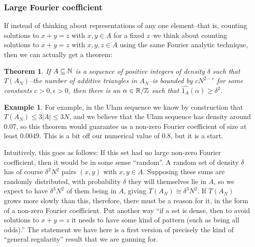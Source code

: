 \documentclass{article}
\newtheorem{theorem}{Theorem}[section]
\theoremstyle{definition}
\newtheorem{example}{Example}
\theoremstyle{remark}
\numberwithin{equation}{section}
\begin{document}
\subsubsection{Large Fourier coefficient}

If instead of thinking about representations of any one element--that
is, counting solutions to $x+y=z$ with $x,y \in A$ for a fixed $z$--we
think about counting solutions to $x+y=z$ with $x,y,z \in A$ using the
same Fourier analytic technique, then we can actually get a theorem: 

\begin{theorem}If $A \subseteq \mathbb{N}$ is a sequence of positive integers
  of density $\delta$ such that $T(A_N)$--the number of additive
  triangles in $A_N$--is bounded by $c N^{2-\epsilon}$ for some
  constants $c > 0, \epsilon > 0$, then there is an $\alpha \in \mathbb{R}/\mathbb{Z}$
  such that $\widehat{1_A}(\alpha) \geq \delta^2$.\end{theorem}

\begin{example}
  For example, in the Ulam sequence we know by construction that
  $T(A_N) \leq 3|A| \leq 3N$, and we believe that the Ulam sequence
  has density around $0.07$, so this theorem would guarantee us a
  non-zero Fourier coefficient of size at least $0.0049$.  This is a
  bit off our numerical value of $0.8$, but it is a start.
\end{example}

Intuitively, this goes as follows: If this set had no large non-zero
Fourier coefficient, then it would be in some sense ``random''.  A
random set of density $\delta$ has of course $\delta^2 N^2$ pairs
$(x,y)$ with $x,y \in A$.  Supposing these sums are randomly
distributed, with probability $\delta$ they will themselves lie in
$A$, so we expect to have $\delta^3 N^2$ of them being in $A$, giving
$T(A_N) \cong \delta^3 N^2$.  If $T(A_N)$ grows more slowly than this,
therefore, there must be a reason for it, in the form of a non-zero
Fourier coefficient.  Put another way ``if a set is dense, then to
avoid solutions to $x+y=z$ it needs to have some kind of pattern (such
as being all odds).''  The statement we have here is a first version
of precisely the kind of ``general regularity'' result that we are
gunning for.
\end{document}
